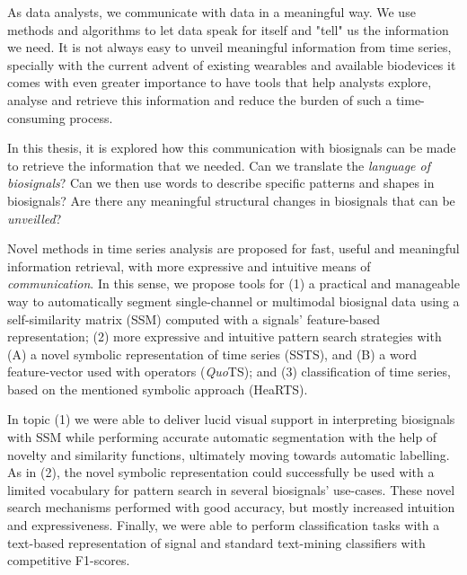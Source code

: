 
%

As data analysts, we communicate with data in a meaningful way. We use methods and algorithms to let data speak for itself and "tell" us the information we need. It is not always easy to unveil meaningful information from time series, specially with the current advent of existing wearables and available biodevices it comes with even greater importance to have tools that help analysts explore, analyse and retrieve this information and reduce the burden of such a time-consuming process. 

In this thesis, it is explored how this communication with biosignals can be made to retrieve the information that we needed. Can we translate the \textit{language of biosignals}? Can we then use words to describe specific patterns and shapes in biosignals? Are there any meaningful structural changes in biosignals  that can be \textit{unveilled}? 

Novel methods in time series analysis are proposed for fast, useful and meaningful information retrieval, with more expressive and intuitive means of \textit{communication}. In this sense, we propose tools for (1) a practical and manageable way to automatically segment single-channel or multimodal biosignal data using a self-similarity matrix (SSM) computed with a signals' feature-based representation; (2) more expressive and intuitive pattern search strategies with (A) a novel symbolic representation of time series (SSTS), and (B) a word feature-vector used with operators (\textit{Quo}TS); and (3) classification of time series, based on the mentioned symbolic approach (HeaRTS). 

In topic (1) we were able to deliver lucid visual support in interpreting biosignals with SSM while performing accurate automatic segmentation with the help of novelty and similarity functions, ultimately moving towards automatic labelling. As in (2), the novel symbolic representation could successfully be used with a limited vocabulary for pattern search in several biosignals' use-cases.  These novel search mechanisms performed with good accuracy, but mostly increased intuition and expressiveness. Finally, we were able to perform classification tasks with a text-based representation of signal and standard text-mining classifiers with competitive F1-scores.


